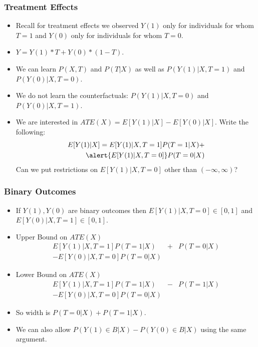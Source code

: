 \documentclass[xcolor=pdftex,dvipsnames,table,mathserif]{beamer}
\begin{document}
\begin{frame}
\frametitle{Treatment Effects}
\begin{itemize}
\item Recall for treatment effects we observed $Y(1)$ only for individuals for whom $T=1$ and $Y(0)$ only for individuals for whom $T=0$.
\item $Y = Y(1) * T + Y(0) * (1-T)$.
\item We can learn $P(X,T)$ and $P(T | X)$ as well as $P(Y(1) | X,T=1)$ and $P(Y(0) | X,T=0)$.
\item We do not learn the counterfactuals: $P(Y(1) | X,T=0)$ and $P(Y(0) | X,T=1)$.
\item We are interested in $ATE(X) = E[Y(1) | X] - E[Y(0) | X]$.
Write the following:
\begin{eqnarray*}
E[Y(1) | X] = E[Y(1) | X,T=1] P(T=1 | X)  +\\
 \alert{E[Y(1) | X,T=0]} P(T=0 | X)
\end{eqnarray*}
Can we put restrictions on $ E[Y(1) | X,T=0]$ other than $(-\infty,\infty)$?
\end{itemize}
\end{frame}

\begin{frame}
\frametitle{Binary Outcomes}
\begin{itemize}
\item If $Y(1),Y(0)$ are binary outcomes then $E[Y(1) | X,T=0] \in[0,1]$ and $E[Y(0) | X,T=1] \in[0,1]$. 
\item Upper Bound on $ATE(X)$
\begin{eqnarray*}
E[Y(1) | X,T=1] P(T=1 | X) &+& P(T=0 | X)  \\
-E[Y(0) | X,T=0] P(T=0 |X) &&
\end{eqnarray*}
\item Lower Bound on $ATE(X)$
\begin{eqnarray*}
E[Y(1) | X,T=1] P(T=1 | X) &-& P(T=1 | X)  \\
-E[Y(0) | X,T=0] P(T=0 |X) &&
\end{eqnarray*}
\item So width is $P(T=0 | X) + P(T=1 |X)$.
\item We can also allow $P(Y(1) \in B |X ) - P(Y(0) \in B|X)$ using the same argument.
\end{itemize}
\end{frame}
\end{document}
